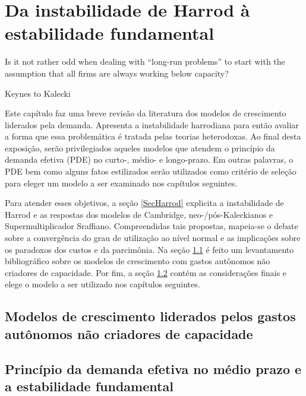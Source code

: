 \chapter{Da instabilidade de Harrod à estabilidade fundamental}

\epigraph{Is it not rather odd when dealing with ``long-run problems'' to start with the assumption that all firms are always working below capacity?}{Keynes to Kalecki}


Este capítulo faz uma breve revisão da literatura dos modelos de crescimento liderados pela demanda. Apresenta a instabilidade harrodiana para então avaliar a forma que essa problemática é tratada pelas teorias heterodoxas.
Ao final desta exposição, serão privilegiados aqueles modelos que atendem o princípio da demanda efetiva (PDE) no curto-, médio- e longo-prazo. Em outras palavras, o PDE bem como alguns fatos estilizados serão utilizados como critério de seleção para eleger um modelo a ser examinado nos capítulos seguintes.


Para atender esses objetivos, a seção \ref{SecHarrod} explicita a instabilidade de Harrod e as respostas dos modelos de Cambridge, neo-/pós-Kaleckianos e Supermultiplicador Sraffiano. Compreendidas tais propostas, mapeia-se o debate sobre a convergência do grau de utilização ao nível normal e as implicações sobre os paradoxos dos custos e da parcimônia. Na seção \ref{Literatura} é feito um levantamento bibliográfico sobre os modelos de crescimento com gastos autônomos não criadores de capacidade. Por fim, a seção \ref{Concl1} contém as considerações finais e elege o modelo a ser utilizado nos capítulos seguintes.



\section{Modelos de crescimento liderados pelos gastos autônomos não criadores de capacidade}\label{Literatura}


\section{Princípio da demanda efetiva no médio prazo e a estabilidade fundamental} \label{Concl1}



